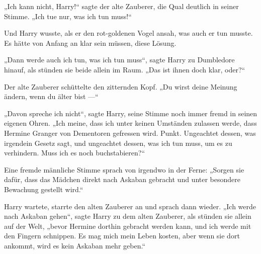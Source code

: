 „Ich kann nicht, Harry!“ sagte der alte Zauberer, die Qual deutlich in seiner Stimme.
„Ich tue nur, was ich tun muss!“

Und Harry wusste, als er den rot-goldenen Vogel ansah, was auch er tun musste. Es hätte von Anfang an klar sein müssen, diese Lösung.

„Dann werde auch ich tun, was ich tun muss“, sagte Harry zu Dumbledore hinauf, als stünden sie beide allein im Raum.
„Das ist ihnen doch klar, oder?“

Der alte Zauberer schüttelte den zitternden Kopf.
„Du wirst deine Meinung ändern, wenn du älter bist —“

„Davon spreche ich nicht“, sagte Harry, seine Stimme noch immer fremd in seinen eigenen Ohren.
„Ich meine, dass ich unter keinen Umständen zulassen werde, dass Hermine Granger von Dementoren gefressen wird. Punkt. Ungeachtet dessen, was irgendein Gesetz sagt, und ungeachtet dessen, was ich tun muss, um es zu verhindern. Muss ich es noch buchstabieren?“

Eine fremde männliche Stimme sprach von irgendwo in der Ferne:
„Sorgen sie dafür, dass das Mädchen direkt nach Askaban gebracht und unter besondere Bewachung gestellt wird.“

Harry wartete, starrte den alten Zauberer an und sprach dann wieder.
„Ich werde nach Askaban gehen“, sagte Harry zu dem alten Zauberer, als stünden sie allein auf der Welt, „bevor Hermine dorthin gebracht werden kann, und ich werde mit den Fingern schnippen. Es mag mich mein Leben kosten, aber wenn sie dort ankommt, wird es kein Askaban mehr geben.“

